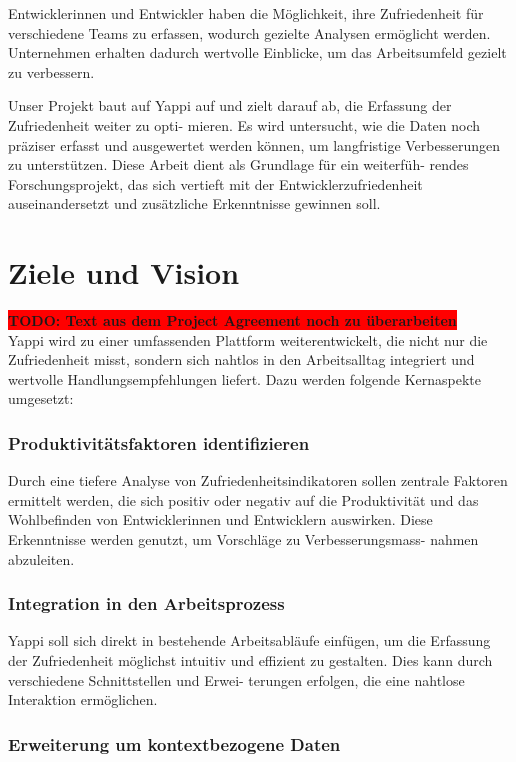 \documentclass[12pt,a4paper]{report}
\newcommand{\todo}[1]{\colorbox{red}{\textbf{TODO: #1}}\\}
\begin{document}
Entwicklerinnen und Entwickler haben die Möglichkeit, ihre Zufriedenheit für verschiedene Teams zu
erfassen, wodurch gezielte Analysen ermöglicht werden. Unternehmen erhalten dadurch wertvolle
Einblicke, um das Arbeitsumfeld gezielt zu verbessern.

Unser Projekt baut auf Yappi auf und zielt darauf ab, die Erfassung der Zufriedenheit weiter zu opti-
mieren. Es wird untersucht, wie die Daten noch präziser erfasst und ausgewertet werden können,
um langfristige Verbesserungen zu unterstützen. Diese Arbeit dient als Grundlage für ein weiterfüh-
rendes Forschungsprojekt, das sich vertieft mit der Entwicklerzufriedenheit auseinandersetzt und
zusätzliche Erkenntnisse gewinnen soll.

\section{Ziele und Vision}

\todo{Text aus dem Project Agreement noch zu überarbeiten}

Yappi wird zu einer umfassenden Plattform weiterentwickelt, die nicht nur die Zufriedenheit misst,
sondern sich nahtlos in den Arbeitsalltag integriert und wertvolle Handlungsempfehlungen liefert.
Dazu werden folgende Kernaspekte umgesetzt:

\subsubsection{Produktivitätsfaktoren identifizieren}

Durch eine tiefere Analyse von Zufriedenheitsindikatoren sollen zentrale Faktoren ermittelt werden,
die sich positiv oder negativ auf die Produktivität und das Wohlbefinden von Entwicklerinnen und
Entwicklern auswirken. Diese Erkenntnisse werden genutzt, um Vorschläge zu Verbesserungsmass-
nahmen abzuleiten.

\subsubsection{Integration in den Arbeitsprozess}

Yappi soll sich direkt in bestehende Arbeitsabläufe einfügen, um die Erfassung der Zufriedenheit
möglichst intuitiv und effizient zu gestalten. Dies kann durch verschiedene Schnittstellen und Erwei-
terungen erfolgen, die eine nahtlose Interaktion ermöglichen.

\subsubsection{Erweiterung um kontextbezogene Daten}
\end{document}
